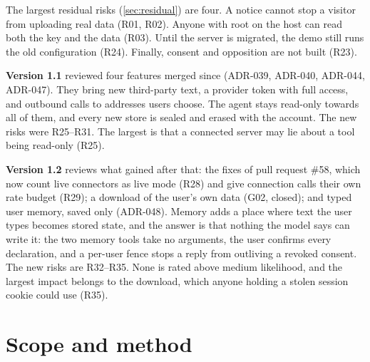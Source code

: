 \documentclass[11pt,a4paper]{article}
\begin{document}
The largest residual risks (\cref{sec:residual}) are four. A notice cannot stop a visitor from uploading real data (R01,
R02). Anyone with root on the host can read both the key and the data (R03). Until the server is migrated, the demo
still runs the old configuration (R24). Finally, consent and opposition are not built (R23).

\textbf{Version 1.1} reviewed four features merged since (ADR-039, ADR-040, ADR-044, ADR-047). They bring new
third-party text, a provider token with full access, and outbound calls to addresses users choose. The agent stays
read-only towards all of them, and every new store is sealed and erased with the account. The new risks were R25--R31.
The largest is that a connected server may lie about a tool being read-only (R25).

\textbf{Version 1.2} reviews what  gained after that: the fixes of pull request \#58, which now count live
connectors as live mode (R28) and give connection calls their own rate budget (R29); a download of the user's own
data (G02, closed); and typed user memory, saved only (ADR-048). Memory adds a place where text the user types becomes
stored state, and the answer is that nothing the model says can write it: the two memory tools take no arguments, the
user confirms every declaration, and a per-user fence stops a reply from outliving a revoked consent. The new risks are
R32--R35. None is rated above medium likelihood, and the largest impact belongs to the download, which anyone holding a
stolen session cookie could use (R35).

\section{Scope and method}\label{sec:scope}
\end{document}
